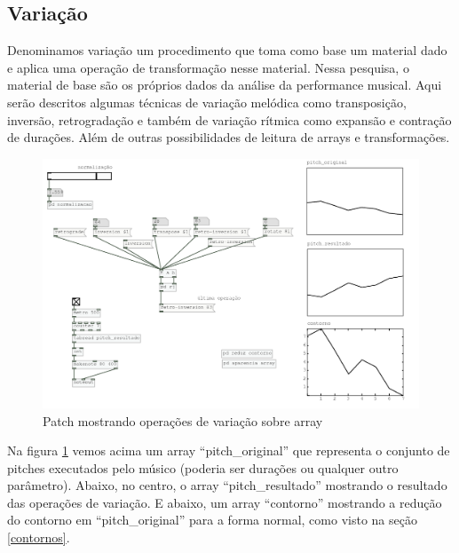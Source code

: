 \documentclass{ppgmus}
\begin{document}

\subsection{Variação}
\label{varia-contorno}


Denominamos variação um procedimento que toma como base um
material dado e aplica uma operação de transformação nesse material.
Nessa pesquisa, o material de base são os próprios dados da 
análise da performance musical.
Aqui serão descritos algumas técnicas de variação melódica como
transposição, inversão, retrogradação e também de variação rítmica
como expansão e contração de durações. Além de outras possibilidades
de leitura de arrays e transformações.

\begin{figure}
\includegraphics[scale=.6]{variacoes-contorno}
\caption{Patch mostrando operações de variação sobre array}
\label{variacoes-contorno}
\end{figure}  

Na figura \ref{variacoes-contorno} vemos acima um array ``pitch\_original'' que representa
o conjunto de pitches executados pelo músico (poderia ser durações ou qualquer
outro parâmetro). Abaixo, no centro, o array ``pitch\_resultado'' mostrando o resultado das  
operações de variação. E abaixo, um array ``contorno'' mostrando a redução do contorno em
``pitch\_original'' para a forma normal, como visto na seção \ref{contornos}.
\end{document}
